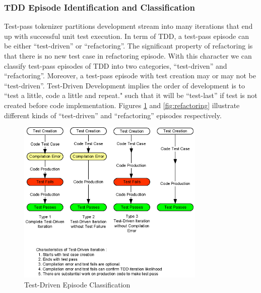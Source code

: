 \subsubsection{TDD Episode Identification and Classification}
Test-pass tokenizer partitions development stream into many iterations that
end up with successful unit test execution. In term of TDD, a test-pass
episode can be either ``test-driven'' or ``refactoring''. The significant
property of refactoring is that there is no new test case in refactoring 
episode. With this character we can classify test-pass episodes of TDD into 
two categories, ``test-driven'' and ``refactoring''.  Moreover, a test-pass 
episode with test creation may or may not be ``test-driven''.  Test-Driven 
Development implies the order of development is to ``test a little, code a 
little and repeat."\cite{Beck:03} such that it will be ``test-last'' if test 
is not created before code implementation. Figures \ref{fig:tdd} and
\ref{fig:refactoring} illustrate different kinds of ``test-driven'' and 
``refactoring'' episodes respectively.

\begin{figure}[h] 
  \centering
  \includegraphics[width=0.8\textwidth]{figs/TDD.eps}
  \caption{Test-Driven Episode Classification}\label{fig:tdd}
\end{figure} 

